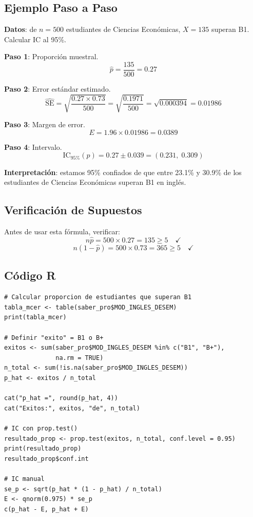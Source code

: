 \documentclass[11pt, a4paper]{article}
\begin{document}
\subsection{Ejemplo Paso a Paso}

\textbf{Datos}: de $n = 500$ estudiantes de Ciencias Econ\'omicas, $X = 135$ superan B1. Calcular IC al 95\%.

\textbf{Paso 1}: Proporci\'on muestral.
\[
\hat{p} = \frac{135}{500} = 0.27
\]

\textbf{Paso 2}: Error est\'andar estimado.
\[
\widehat{\text{SE}} = \sqrt{\frac{0.27 \times 0.73}{500}} = \sqrt{\frac{0.1971}{500}} = \sqrt{0.000394} = 0.01986
\]

\textbf{Paso 3}: Margen de error.
\[
E = 1.96 \times 0.01986 = 0.0389
\]

\textbf{Paso 4}: Intervalo.
\[
\text{IC}_{95\%}(p) = 0.27 \pm 0.039 = (0.231, \; 0.309)
\]

\textbf{Interpretaci\'on}: estamos 95\% confiados de que entre 23.1\% y 30.9\% de los estudiantes de Ciencias Econ\'omicas superan B1 en ingl\'es.

\subsection{Verificaci\'on de Supuestos}

Antes de usar esta f\'ormula, verificar:
\[
n\hat{p} = 500 \times 0.27 = 135 \geq 5 \quad\checkmark
\]
\[
n(1-\hat{p}) = 500 \times 0.73 = 365 \geq 5 \quad\checkmark
\]

\subsection{C\'odigo R}

\begin{lstlisting}
# Calcular proporcion de estudiantes que superan B1
tabla_mcer <- table(saber_pro$MOD_INGLES_DESEM)
print(tabla_mcer)

# Definir "exito" = B1 o B+
exitos <- sum(saber_pro$MOD_INGLES_DESEM %in% c("B1", "B+"),
              na.rm = TRUE)
n_total <- sum(!is.na(saber_pro$MOD_INGLES_DESEM))
p_hat <- exitos / n_total

cat("p_hat =", round(p_hat, 4))
cat("Exitos:", exitos, "de", n_total)

# IC con prop.test()
resultado_prop <- prop.test(exitos, n_total, conf.level = 0.95)
print(resultado_prop)
resultado_prop$conf.int

# IC manual
se_p <- sqrt(p_hat * (1 - p_hat) / n_total)
E <- qnorm(0.975) * se_p
c(p_hat - E, p_hat + E)
\end{lstlisting}
\end{document}
